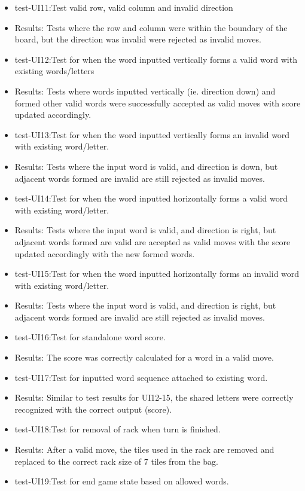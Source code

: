 \documentclass[12pt, titlepage]{article}
\begin{document}
\begin{itemize}
    \item test-UI11:Test valid row, valid column and invalid direction
    \item Results: Tests where the row and column were within the boundary of the board, but the direction was invalid were rejected as invalid moves.
    \item test-UI12:Test for when the word inputted vertically forms a valid word
with existing words/letters
    \item Results: Tests where words inputted vertically (ie. direction down) and formed other valid words were successfully accepted as valid moves with score updated accordingly. 
    \item test-UI13:Test for when the word inputted vertically forms an invalid
word with existing word/letter.
    \item Results: Tests where the input word is valid, and direction is down, but adjacent words formed are invalid are still rejected as invalid moves. 
    \item test-UI14:Test for when the word inputted horizontally forms a valid
word with existing word/letter.
    \item Results: Tests where the input word is valid, and direction is right, but adjacent words formed are valid are accepted as valid moves with the score updated accordingly with the new formed words.
    \item test-UI15:Test for when the word inputted horizontally forms an invalid
word with existing word/letter.
    \item Results: Tests where the input word is valid, and direction is right, but adjacent words formed are invalid are still rejected as invalid moves. 
    \item test-UI16:Test for standalone word score.
    \item Results: The score was correctly calculated for a word in a valid move.
    \item test-UI17:Test for inputted word sequence attached to existing word.
    \item Results: Similar to test results for UI12-15, the shared letters were correctly recognized with the correct output (score).
    \item test-UI18:Test for removal of rack when turn is finished.
    \item Results: After a valid move, the tiles used in the rack are removed and replaced to the correct rack size of 7 tiles from the bag.
    \item test-UI19:Test for end game state based on allowed words.

\end{itemize}
\end{document}
